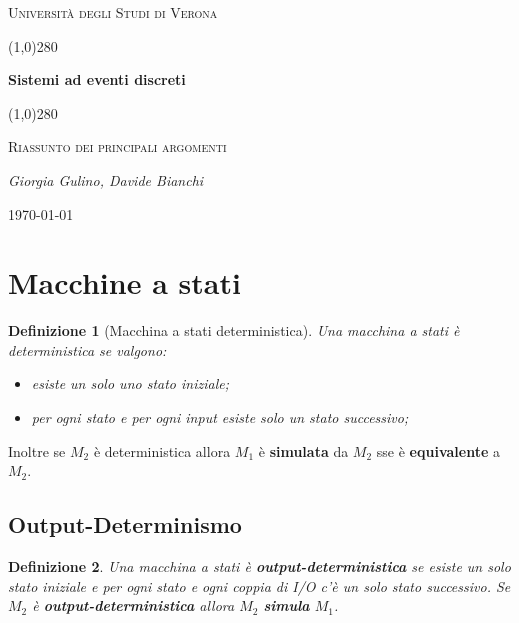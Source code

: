 \documentclass[a4paper]{article}
\date{\today}
\newcommand{\od}{\textbf{output-deterministica }}
\newtheorem{definit}{Definizione}[subsection]
\begin{document}
 \clearpage
 \begin{titlepage}
 	\centering
 	\vspace*{\fill}
 	{\scshape\LARGE Università degli Studi di Verona \par}
 	\vspace{1.5cm}
 	\line(1,0){280} \\
 	{\huge\bfseries Sistemi ad eventi discreti\par}
 	\line(1,0){280} \\
 	\vspace{0.5cm}
 	{\scshape\Large Riassunto dei principali argomenti\par}
 	\vspace{2cm}
 	{\Large\itshape Giorgia Gulino, Davide Bianchi\par}
 	\vspace{1cm}

 	\vspace{5cm}
 	\vspace*{\fill}
 	{\large \today\par}
 \end{titlepage}
 \thispagestyle{empty}
\newpage
\tableofcontents
\newpage

\section{Macchine a stati}

\begin{definit}[Macchina a stati deterministica]
Una macchina a stati è deterministica se valgono: \begin{itemize}
	\item esiste un solo uno stato iniziale;
	\item per ogni stato e per ogni input esiste solo un stato successivo;
\end{itemize}  
\end{definit}
Inoltre se $M_2$ è deterministica allora $M_1$ è \textbf{simulata} da $M_2$ sse è \textbf{equivalente} a $M_2$.

\subsection{Output-Determinismo}
\begin{definit}
	Una macchina a stati è \textbf{output-deterministica} se esiste un solo stato iniziale e per ogni stato e ogni coppia di I/O c'è un solo stato successivo. Se $M_2$ è \od allora $M_2$ \textbf{simula} $M_1$.
\end{definit}
\end{document}

